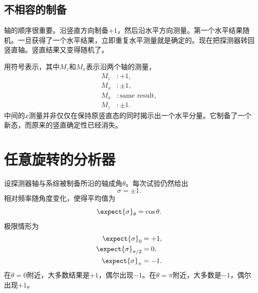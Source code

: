 \subsection{不相容的制备}

轴的顺序很重要。沿竖直方向制备\(+1\)，然后沿水平方向测量。第一个水平结果随机。一旦获得了一个水平结果，立即重复水平测量就是确定的。现在把探测器转回竖直轴。竖直结果又变得随机了。

用符号表示，其中\(M_z\)和\(M_x\)表示沿两个轴的测量，
\begin{equation}
\begin{aligned}
  M_z&:+1,\\
  M_x&:\pm1,\\
  M_x&:\text{same result},\\
  M_z&:\pm1.
\end{aligned}
\end{equation}
中间的\(x\)测量并非仅仅在保持原竖直态的同时揭示出一个水平分量。它制备了一个新态，而原来的竖直确定性已经消失。

\begin{classroomqa}
\end{classroomqa}

\begin{classroomqa}
\end{classroomqa}

\section{任意旋转的分析器}

设探测器轴与系综被制备所沿的轴成角\(\theta\)。每次试验仍然给出
\begin{equation}
  \sigma=\pm1.
\end{equation}
相对频率随角度变化，使得平均值为
\begin{equation}
  \expect{\sigma}_{\theta}=\cos\theta.
  \label{eq:qml1-cosine-mean}
\end{equation}
极限情形为
\begin{align}
  \expect{\sigma}_{0}&=+1,\\
  \expect{\sigma}_{\pi/2}&=0,\\
  \expect{\sigma}_{\pi}&=-1.
\end{align}
在\(\theta=0\)附近，大多数结果是\(+1\)，偶尔出现\(-1\)。在\(\theta=\pi\)附近，大多数是\(-1\)，偶尔出现\(+1\)。

